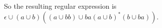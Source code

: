 \begin{problem}{2}
\begin{solution}
\begin{figure}[H]
{      }
    \end{figure}
  So the resulting regular expression is $\epsilon \cup (a \cup b)((a \cup bb) \cup ba(a \cup b)^*(b \cup ba))$.
  \end{solution}
\end{problem} \newpage

